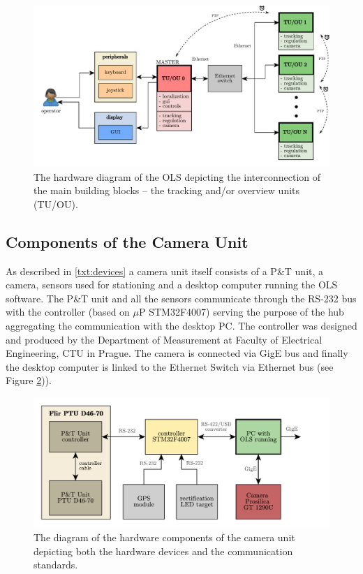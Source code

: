 \begin{figure}[htb]
	\centering
	\includegraphics[width=0.9\linewidth]{fig/hwsw_architecture.pdf}
	\caption{The hardware diagram of the OLS depicting the interconnection of the main building blocks -- the tracking and/or overview units (TU/OU).}
	\label{fig:hw_ols}
\end{figure}

\subsection{Components of the Camera Unit} \label{txt:components_of_cu}

As described in \ref{txt:devices} a camera unit itself consists of a P\&T unit, a camera, sensors used for stationing and a desktop computer running the OLS software. The P\&T unit and all the sensors communicate through the RS-232 bus with the controller (based on $\mu$P STM32F4007) serving the purpose of the hub aggregating the communication with the desktop PC. The controller was designed and produced by the Department of Measurement at Faculty of Electrical Engineering, CTU in Prague. The camera is connected via GigE bus and finally the desktop computer is linked to the Ethernet Switch via Ethernet bus (see Figure \ref{fig:hw_camera_unit})).

\begin{figure}[htb]
	\centering
	\includegraphics[width=0.8\linewidth]{fig/hw_camera_unit.pdf}
	\caption{The diagram of the hardware components of the camera unit depicting both the hardware devices and the communication standards.}
	\label{fig:hw_camera_unit}
\end{figure}

